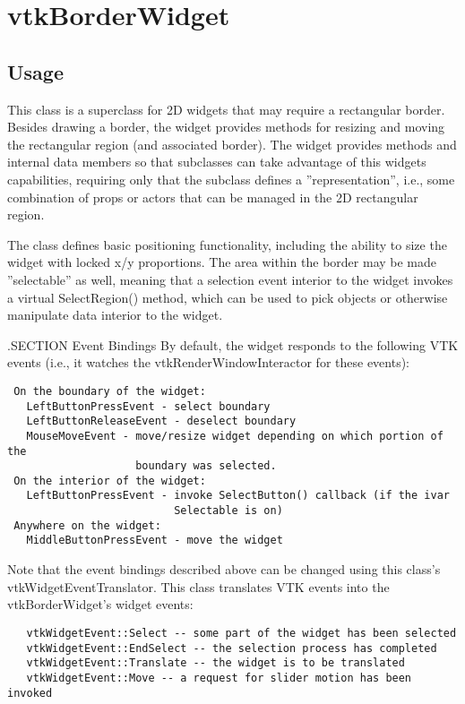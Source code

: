 \section{vtkBorderWidget}

\subsection{Usage}

 This class is a superclass for 2D widgets that may require a rectangular
 border. Besides drawing a border, the widget provides methods for resizing
 and moving the rectangular region (and associated border). The widget
 provides methods and internal data members so that subclasses can take
 advantage of this widgets capabilities, requiring only that the subclass
 defines a ''representation'', i.e., some combination of props or actors
 that can be managed in the 2D rectangular region. 

 The class defines basic positioning functionality, including the ability
 to size the widget with locked x/y proportions. The area within the border
 may be made ''selectable'' as well, meaning that a selection event interior
 to the widget invokes a virtual SelectRegion() method, which can be used
 to pick objects or otherwise manipulate data interior to the widget.

 .SECTION Event Bindings
 By default, the widget responds to the following VTK events (i.e., it
 watches the vtkRenderWindowInteractor for these events):
 \begin{verbatim}
 On the boundary of the widget:
   LeftButtonPressEvent - select boundary
   LeftButtonReleaseEvent - deselect boundary
   MouseMoveEvent - move/resize widget depending on which portion of the
                    boundary was selected.
 On the interior of the widget:
   LeftButtonPressEvent - invoke SelectButton() callback (if the ivar
                          Selectable is on)
 Anywhere on the widget:
   MiddleButtonPressEvent - move the widget
 \end{verbatim}

 Note that the event bindings described above can be changed using this
 class's vtkWidgetEventTranslator. This class translates VTK events 
 into the vtkBorderWidget's widget events:
 \begin{verbatim}
   vtkWidgetEvent::Select -- some part of the widget has been selected
   vtkWidgetEvent::EndSelect -- the selection process has completed
   vtkWidgetEvent::Translate -- the widget is to be translated
   vtkWidgetEvent::Move -- a request for slider motion has been invoked
 \end{verbatim}

